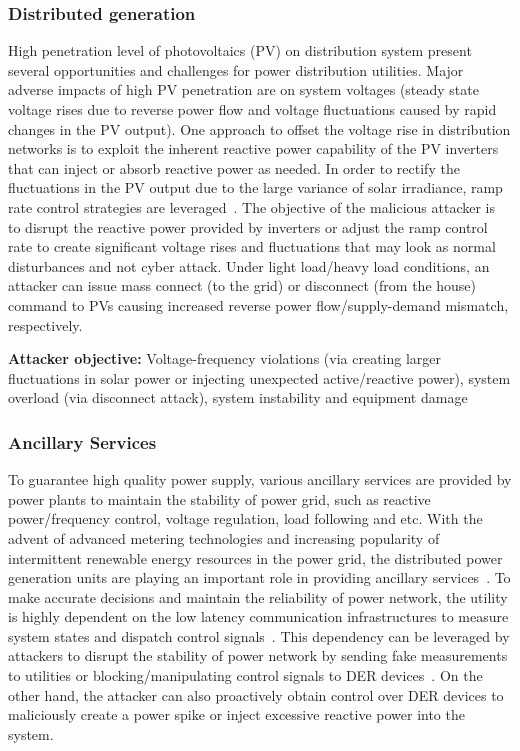 \documentclass[conference]{IEEEtran}
\begin{document}
\subsubsection{Distributed generation}
High penetration level of photovoltaics (PV) on distribution system present several opportunities
and challenges for power distribution utilities. Major adverse impacts of high PV penetration are on system
voltages (steady state voltage rises due to reverse power flow and voltage fluctuations caused by rapid changes in the PV output). One approach to offset the voltage rise in distribution networks is to exploit the inherent reactive power capability of the PV inverters that can inject or absorb reactive power as needed. In order to rectify the fluctuations in the PV output due to the large variance of solar irradiance, ramp rate control strategies are leveraged~\cite{Alam:EC2014}. The objective of the malicious attacker is to disrupt the reactive power provided by inverters or adjust the ramp control rate to create significant voltage rises and fluctuations that may look as  normal disturbances and not cyber attack. Under light load/heavy load conditions, an attacker can issue mass connect (to the grid) or disconnect (from the house) command to PVs causing increased reverse power flow/supply-demand mismatch, respectively. 

\textbf{Attacker objective:} Voltage-frequency violations (via  creating larger fluctuations in solar power or injecting unexpected active/reactive power), system overload (via disconnect attack), system instability and equipment damage 
\subsubsection{Ancillary Services}
To guarantee high quality power supply, various ancillary services are provided by power plants to maintain the stability of power grid, such as reactive power/frequency control, voltage regulation, load following and etc. With the advent of advanced metering technologies and increasing popularity of intermittent renewable energy resources in the power grid, the distributed power generation units are playing an important role in providing ancillary services~\cite{Hess:SGT2016,Pires:IES2016,Kim:PS2017}. To make accurate decisions and maintain the reliability of power network, the utility is highly dependent on the low latency communication infrastructures to measure system states and dispatch control signals~\cite{Cleveland:2013}. This dependency can be leveraged by attackers to disrupt the stability of power network by sending fake measurements to utilities or blocking/manipulating control signals to DER devices~\cite{Srikantha:ISGT2015}. On the other hand, the attacker can also proactively obtain control over DER devices to maliciously create a power spike or inject excessive reactive power into the system.
\end{document}

